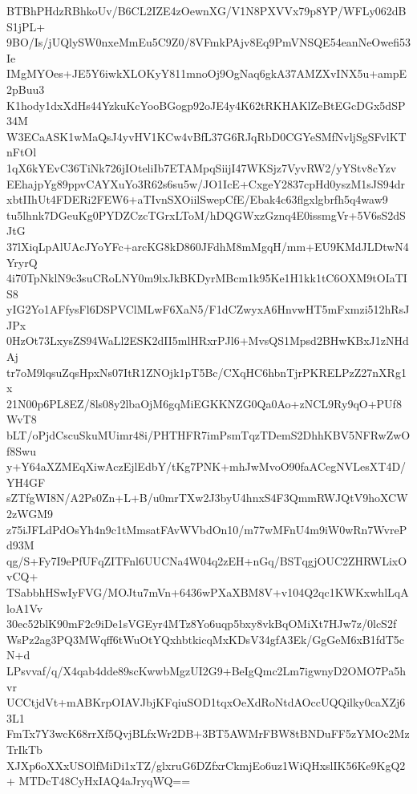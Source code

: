 BTBhPHdzRBhkoUv/B6CL2IZE4zOewnXG/V1N8PXVVx79p8YP/WFLy062dBS1jPL+
9BO/Is/jUQlySW0nxeMmEu5C9Z0/8VFmkPAjv8Eq9PmVNSQE54eanNeOwefi53Ie
IMgMYOes+JE5Y6iwkXLOKyY811mnoOj9OgNaq6gkA37AMZXvINX5u+ampE2pBuu3
K1hody1dxXdHs44YzkuKcYooBGogp92oJE4y4K62tRKHAKlZeBtEGcDGx5dSP34M
W3ECaASK1wMaQsJ4yvHV1KCw4vBfL37G6RJqRbD0CGYeSMfNvljSgSFvlKTnFtOl
1qX6kYEvC36TiNk726jIOteliIb7ETAMpqSiijI47WKSjz7VyvRW2/yYStv8cYzv
EEhajpYg89ppvCAYXuYo3R62s6su5w/JO1IcE+CxgeY2837cpHd0yszM1sJS94dr
xbtIIhUt4FDERi2FEW6+aTIvnSXOiilSwepCfE/Ebak4c63flgxlgbrfh5q4waw9
tu5lhnk7DGeuKg0PYDZCzcTGrxLToM/hDQGWxzGznq4E0issmgVr+5V6sS2dSJtG
37lXiqLpAlUAcJYoYFc+arcKG8kD860JFdhM8mMgqH/mm+EU9KMdJLDtwN4YryrQ
4i70TpNklN9c3suCRoLNY0m9lxJkBKDyrMBcm1k95Ke1H1kk1tC6OXM9tOIaTIS8
yIG2Yo1AFfysFl6DSPVClMLwF6XaN5/F1dCZwyxA6HnvwHT5mFxmzi512hRsJJPx
0HzOt73LxysZS94WaLl2ESK2dII5mlHRxrPJl6+MvsQS1Mpsd2BHwKBxJ1zNHdAj
tr7oM9lqsuZqsHpxNs07ItR1ZNOjk1pT5Bc/CXqHC6hbnTjrPKRELPzZ27nXRg1x
21N00p6PL8EZ/8ls08y2lbaOjM6gqMiEGKKNZG0Qa0Ao+zNCL9Ry9qO+PUf8WvT8
bLT/oPjdCscuSkuMUimr48i/PHTHFR7imPsmTqzTDemS2DhhKBV5NFRwZwOf8Swu
y+Y64aXZMEqXiwAczEjlEdbY/tKg7PNK+mhJwMvoO90faACegNVLesXT4D/YH4GF
sZTfgWI8N/A2Ps0Zn+L+B/u0mrTXw2J3byU4hnxS4F3QmmRWJQtV9hoXCW2zWGM9
z75iJFLdPdOsYh4n9c1tMmsatFAvWVbdOn10/m77wMFnU4m9iW0wRn7WvrePd93M
qg/S+Fy7I9ePfUFqZITFnl6UUCNa4W04q2zEH+nGq/BSTqgjOUC2ZHRWLixOvCQ+
TSabbhHSwIyFVG/MOJtu7mVn+6436wPXaXBM8V+v104Q2qc1KWKxwhlLqAloA1Vv
30ec52blK90mF2c9iDe1sVGEyr4MTz8Yo6uqp5bxy8vkBqOMiXt7HJw7z/0lcS2f
WsPz2ag3PQ3MWqff6tWuOtYQxhbtkicqMxKDsV34gfA3Ek/GgGeM6xB1fdT5cN+d
LPsvvaf/q/X4qab4dde89scKwwbMgzUI2G9+BeIgQmc2Lm7igwnyD2OMO7Pa5hvr
UCCtjdVt+mABKrpOIAVJbjKFqiuSOD1tqxOeXdRoNtdAOccUQQilky0caXZj63L1
FmTx7Y3wcK68rrXf5QvjBLfxWr2DB+3BT5AWMrFBW8tBNDuFF5zYMOc2MzTrIkTb
XJXp6oXXxUSOlfMiDi1xTZ/glxruG6DZfxrCkmjEo6uz1WiQHxslIK56Ke9KgQ2+
MTDcT48CyHxIAQ4aJryqWQ==
